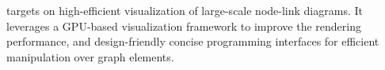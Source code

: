 \name targets on high-efficient visualization of large-scale node-link diagrams. It leverages a GPU-based visualization framework to improve the rendering performance, and design-friendly concise programming interfaces for efficient manipulation over graph elements.









